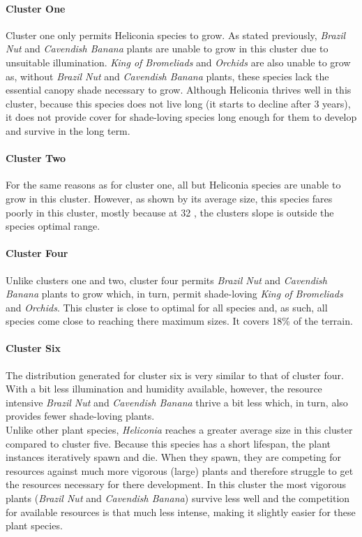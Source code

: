 \paragraph{Cluster One}
Cluster one only permits Heliconia species to grow. As stated previously, \textit{Brazil Nut} and \textit{Cavendish Banana} plants are unable to grow in this cluster due to unsuitable illumination. \textit{King of Bromeliads} and \textit{Orchids} are also unable to grow as, without \textit{Brazil Nut} and \textit{Cavendish Banana} plants, these species lack the essential canopy shade necessary to grow. Although Heliconia thrives well in this cluster, because this species does not live long (it starts to decline after 3 years), it does not provide cover for shade-loving species long enough for them to develop and survive in the long term.

\paragraph{Cluster Two}

For the same reasons as for cluster one, all but Heliconia species are unable to grow in this cluster. However, as shown by its average size, this species fares poorly in this cluster, mostly because at 32 \textdegree, the clusters slope is outside the species optimal range.

\paragraph{Cluster Four}

Unlike clusters one and two, cluster four permits \textit{Brazil Nut} and \textit{Cavendish Banana} plants to grow which, in turn, permit shade-loving \textit{King of Bromeliads} and \textit{Orchids}. This cluster is close to optimal for all species and, as such, all species come close to reaching there maximum sizes. It covers 18\% of the terrain.

\paragraph{Cluster Six}

The distribution generated for cluster six is very similar to that of cluster four. With a bit less illumination and humidity available, however, the resource intensive \textit{Brazil Nut} and \textit{Cavendish Banana} thrive a bit less which, in turn, also provides fewer shade-loving plants.\\
Unlike other plant species, \textit{Heliconia} reaches a greater average size in this cluster compared to cluster five. Because this species has a short lifespan, the plant instances iteratively spawn and die. When they spawn, they are competing for resources against much more vigorous (large) plants and therefore struggle to get the resources necessary for there development. In this cluster the most vigorous plants (\textit{Brazil Nut} and \textit{Cavendish Banana}) survive less well and the competition for available resources is that much less intense, making it slightly easier for these plant species.\\

